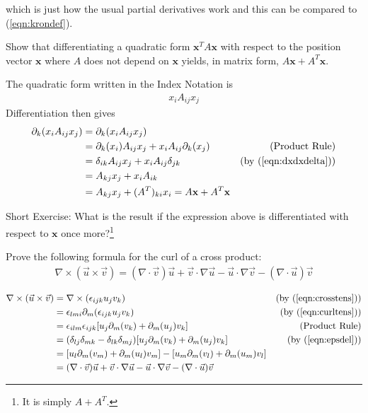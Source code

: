 which is just how the usual partial derivatives work and this can be compared to (\ref{eqn:krondef}).
\begin{exmp}
Show that differentiating a quadratic form $\textbf{x}^TA\textbf{x}$ with respect to the position vector $\textbf{x}$ where $A$ does not depend on $\textbf{x}$ yields, in matrix form, $A\textbf{x} + A^T\textbf{x}$.
\end{exmp}
\begin{solution}
The quadratic form written in the Index Notation is
\begin{align*}
x_iA_{ij}x_j
\end{align*}
Differentiation then gives
\begin{align*}
\partial_k (x_iA_{ij}x_j) &= \partial_k (x_iA_{ij}x_j) \\
&= \partial_k (x_i) A_{ij}x_j + x_iA_{ij} \partial_k (x_j) & \text{(Product Rule)} \\
&= \delta_{ik} A_{ij}x_j + x_iA_{ij} \delta_{jk} & \text{(by (\ref{eqn:dxdxdelta}))} \\
&= A_{kj}x_j + x_iA_{ik} \\
&= A_{kj}x_j + (A^T)_{ki}x_i = A\textbf{x} + A^T\textbf{x}
\end{align*}
\end{solution}
Short Exercise: What is the result if the expression above is differentiated with respect to $\textbf{x}$ once more?\footnote{It is simply $A+A^T$.}

\begin{exmp}
Prove the following formula for the curl of a cross product:
\begin{align}
\nabla \times (\vec{u} \times \vec{v}) = (\nabla \cdot \vec{v})\vec{u} + \vec{v} \cdot \nabla\vec{u} - \vec{u} \cdot \nabla\vec{v} - (\nabla \cdot \vec{u})\vec{v}  
\end{align}
\end{exmp}
\begin{solution}
\begin{align*}
\nabla \times (\vec{u} \times \vec{v}) &= \nabla \times (\epsilon_{ijk}u_jv_k) &\text{(by (\ref{eqn:crosstens}))} \\
&= \epsilon_{lmi}\partial_m (\epsilon_{ijk}u_jv_k) &\text{(by (\ref{eqn:curltens}))} \\
&= \epsilon_{ilm}\epsilon_{ijk} [u_j\partial_m(v_k) + \partial_m(u_j)v_k] &\text{(Product Rule)} \\
&= (\delta_{lj}\delta_{mk} - \delta_{lk}\delta_{mj}) [u_j\partial_m(v_k) + \partial_m(u_j)v_k] &\text{(by (\ref{eqn:epsdel}))} \\
&= [u_l\partial_m(v_m) + \partial_m(u_l)v_m] - [u_m\partial_m(v_l) + \partial_m(u_m)v_l] \\
&= (\nabla \cdot \vec{v})\vec{u} + \vec{v} \cdot \nabla\vec{u} - \vec{u} \cdot \nabla\vec{v} - (\nabla \cdot \vec{u})\vec{v}
\end{align*}
\end{solution}


